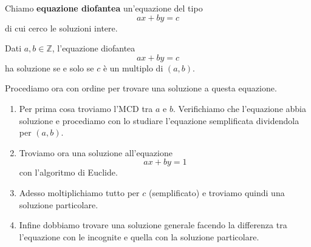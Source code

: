 \begin{defn}
	Chiamo \textbf{equazione diofantea} un'equazione del tipo
	\begin{equation*}
		ax + by = c
	\end{equation*}
	di cui cerco le soluzioni intere.
\end{defn}

\begin{theorem}
	Dati $a, b \in \mathbb{Z}$, l'equazione diofantea
	\begin{equation*}
		ax + by = c
	\end{equation*}
	ha soluzione se e solo se $c$ \`e un multiplo di $(a, b)$.
\end{theorem}

Procediamo ora con ordine per trovare una soluzione a questa equazione.
\begin{enumerate}
	\item Per prima cosa troviamo l'MCD tra $a$ e $b$. Verifichiamo che l'equazione abbia
	      soluzione e procediamo con lo studiare l'equazione semplificata dividendola per
	      $(a, b)$.
	\item Troviamo ora una soluzione all'equazione
	      \begin{equation*}
		      ax + by = 1
	      \end{equation*}
	      con l'algoritmo di Euclide.
	\item Adesso moltiplichiamo tutto per $c$ (semplificato) e troviamo quindi una soluzione
	      particolare.
	\item Infine dobbiamo trovare una soluzione generale facendo la differenza tra l'equazione
	      con le incognite e quella con la soluzione particolare.
\end{enumerate}

